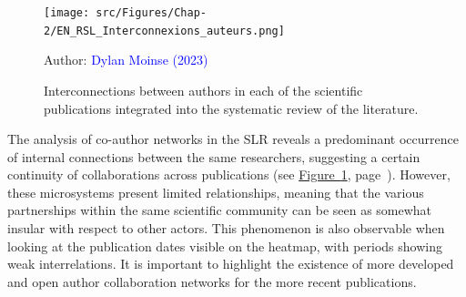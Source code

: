 \begin{refsegment}
    \begin{figure}[h!]\vspace*{4pt}
        \caption{Interconnections between authors in each of the scientific publications integrated into the systematic review of the literature.}
        \label{fig-chap2:interconnexions-auteurs-rsl}
        \centerline{\texttt{[image: src/Figures/Chap-2/EN\_RSL\_Interconnexions\_auteurs.png]}}
        \vspace{5pt}
        \begin{flushright}\scriptsize{
        Author: \textcolor{blue}{Dylan Moinse (2023)}
        }\end{flushright}
    \end{figure}

The analysis of co-author networks in the \acrshort{SLR} reveals a predominant occurrence of internal connections between the same researchers, suggesting a certain continuity of collaborations across publications (see \hyperref[fig-chap2:interconnexions-auteurs-rsl]{Figure~\ref{fig-chap2:interconnexions-auteurs-rsl}}, page~\pageref{fig-chap2:interconnexions-auteurs-rsl}). However, these microsystems present limited relationships, meaning that the various partnerships within the same scientific community can be seen as somewhat insular with respect to other actors. This phenomenon is also observable when looking at the publication dates visible on the heatmap, with periods showing weak interrelations. It is important to highlight the existence of more developed and open author collaboration networks for the more recent publications.%


\end{refsegment}
